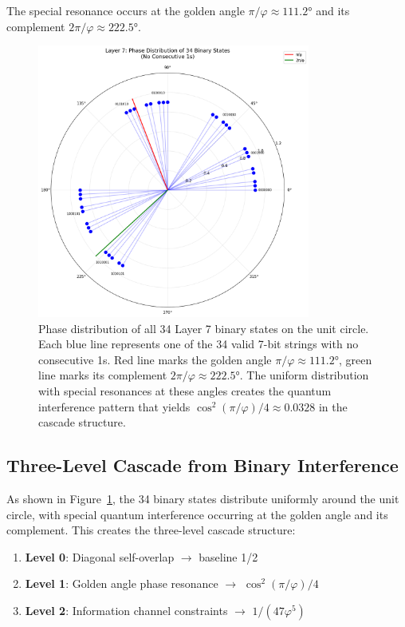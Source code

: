 \documentclass[%
 reprint,
 amsmath,amssymb,
 aps,
 prd,
 10pt,
 nofootinbib,      %
 longbibliography  %
]{revtex4-2}
\theoremstyle{definition}
\theoremstyle{remark}
\begin{document}
The special resonance occurs at the golden angle $\pi/\varphi \approx 111.2°$ and its complement $2\pi/\varphi \approx 222.5°$.

\begin{figure}[htbp]
\centering
\includegraphics[width=0.8\textwidth]{layer7_phase_wheel.png}
\caption{Phase distribution of all 34 Layer 7 binary states on the unit circle. Each blue line represents one of the 34 valid 7-bit strings with no consecutive 1s. Red line marks the golden angle $\pi/\varphi \approx 111.2°$, green line marks its complement $2\pi/\varphi \approx 222.5°$. The uniform distribution with special resonances at these angles creates the quantum interference pattern that yields $\cos^2(\pi/\varphi)/4 \approx 0.0328$ in the cascade structure.}
\label{fig:layer7_phase}
\end{figure}

\subsection{Three-Level Cascade from Binary Interference}

As shown in Figure~\ref{fig:layer7_phase}, the 34 binary states distribute uniformly around the unit circle, with special quantum interference occurring at the golden angle and its complement. This creates the three-level cascade structure:

\begin{enumerate}
\item \textbf{Level 0}: Diagonal self-overlap $\to$ baseline 1/2
\item \textbf{Level 1}: Golden angle phase resonance $\to$ $\cos^2(\pi/\varphi)/4$
\item \textbf{Level 2}: Information channel constraints $\to$ $1/(47\varphi^5)$
\end{enumerate}
\end{document}
